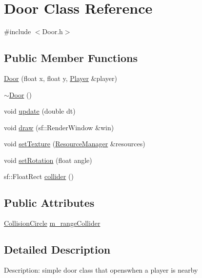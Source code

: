 \hypertarget{class_door}{}\section{Door Class Reference}
\label{class_door}


{\ttfamily \#include $<$Door.\+h$>$}

\subsection*{Public Member Functions}
\begin{DoxyCompactItemize}
\item 
\mbox{\hyperlink{class_door_a7645be7f8752d419f8d2d5734eaa7ebd}{Door}} (float x, float y, \mbox{\hyperlink{class_player}{Player}} \&player)
\item 
\mbox{\hyperlink{class_door_a3dbbbd7a49698a8461d3c22df60bd2d3}{$\sim$\+Door}} ()
\item 
void \mbox{\hyperlink{class_door_a47a3f92167ee4b4ce53c9c93e7d5b805}{update}} (double dt)
\item 
void \mbox{\hyperlink{class_door_a67129ae17ae7d32e2db613c0ba8d21ff}{draw}} (sf\+::\+Render\+Window \&win)
\item 
void \mbox{\hyperlink{class_door_a1f958c48c09f2f57d1a117764764fbfc}{set\+Texture}} (\mbox{\hyperlink{class_resource_manager}{Resource\+Manager}} \&resources)
\item 
void \mbox{\hyperlink{class_door_a482562e2f8ffe5857491464debd419ad}{set\+Rotation}} (float angle)
\item 
sf\+::\+Float\+Rect \mbox{\hyperlink{class_door_a981d32d899bf7bf19833bce9e47364a1}{collider}} ()
\end{DoxyCompactItemize}
\subsection*{Public Attributes}
\begin{DoxyCompactItemize}
\item 
\mbox{\hyperlink{class_collision_circle}{Collision\+Circle}} \mbox{\hyperlink{class_door_a671b74fd40342beadc202df82132621b}{m\+\_\+range\+Collider}}
\end{DoxyCompactItemize}


\subsection{Detailed Description}
Description\+: simple door class that openswhen a player is nearby 

